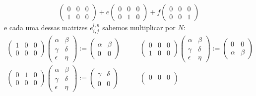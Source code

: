 \begin{ex}
\begin{align*}
\begin{pmatrix}
	0&0&0\\
	1&0&0
	\end{pmatrix}+e
	\begin{pmatrix}
	0&0&0\\
	0&1&0
	\end{pmatrix}+f
	\begin{pmatrix}
	0&0&0\\
	0&0&1
	\end{pmatrix}
	\end{align*}e cada uma dessas matrizes $e^{l,n}_{i,j}$ sabemos multiplicar por $N$:
	\begin{align*}
		\begin{pmatrix}
		1&0&0\\
		0&0&0
		\end{pmatrix}\begin{pmatrix}
		\alpha &\beta\\
		\gamma & \delta\\
		\epsilon & \eta	
		\end{pmatrix}:=\begin{pmatrix}
		\alpha &\beta\\
		0 & 0	
		\end{pmatrix}\quad\quad&\begin{pmatrix}
		0&0&0\\
		1&0&0
		\end{pmatrix}\begin{pmatrix}
		\alpha &\beta\\
		\gamma & \delta\\
		\epsilon & \eta	
		\end{pmatrix}:=\begin{pmatrix}
		0 & 0\\
		\alpha &\beta
		\end{pmatrix}\\		
		\begin{pmatrix}
		0&1&0\\
		0&0&0
		\end{pmatrix}\begin{pmatrix}
		\alpha &\beta\\
		\gamma & \delta\\
		\epsilon & \eta	
		\end{pmatrix}:=\begin{pmatrix}
		\gamma &\delta\\
		0 & 0	
		\end{pmatrix}\quad\quad&\begin{pmatrix}
		0&0&0\\

\end{pmatrix}
\end{align*}
\end{ex}
